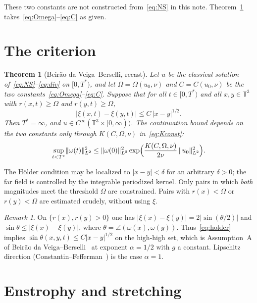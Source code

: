 \documentclass[11pt,a4paper]{article}
\newtheorem{theorem}{Theorem}
\theoremstyle{definition}
\theoremstyle{remark}
\newtheorem{remark}{Remark}
\newcommand{\T}{\mathbb{T}}
\newcommand{\abs}[1]{\lvert#1\rvert}
\newcommand{\norm}[1]{\lVert#1\rVert}
\begin{document}
These two constants are not constructed from~\eqref{eq:NS} in this note.
Theorem~\ref{thm:A} takes~\eqref{eq:Omega}--\eqref{eq:C} as given.

\section{The criterion}

\begin{theorem}[Beir\~ao da Veiga--Berselli, recast]
\label{thm:A}
Let \(u\) be the classical solution of~\eqref{eq:NS}--\eqref{eq:div} on
\([0,T^*)\), and let \(\Omega=\Omega(u_0,\nu)\) and \(C=C(u_0,\nu)\) be
the two constants~\eqref{eq:Omega}--\eqref{eq:C}. Suppose that for all
\(t\in[0,T^*)\) and all \(x,y\in\T^3\) with \(r(x,t)\ge\Omega\) and
\(r(y,t)\ge\Omega\),
\begin{equation}
\label{eq:holder}
\abs{\xi(x,t)-\xi(y,t)}\le C\,\abs{x-y}^{1/2}.
\end{equation}
Then \(T^*=\infty\), and \(u\in C^\infty(\T^3\times[0,\infty))\).
The continuation bound depends on the two constants only through \(K(C,\Omega,\nu)\)
in~\eqref{eq:Kconst}:
\begin{equation}
\label{eq:bound-thm}
\sup_{t<T^*}\norm{\omega(t)}_{L^2}^2
\le \norm{\omega(0)}_{L^2}^2
\exp\Bigl(\frac{K(C,\Omega,\nu)}{2\nu}\,\norm{u_0}_{L^2}^2\Bigr).
\end{equation}
\end{theorem}

The H\"older condition may be localized to \(\abs{x-y}<\delta\) for an
arbitrary \(\delta>0\); the far field is controlled by the integrable
periodized kernel. Only pairs in which \emph{both} magnitudes meet the
threshold \(\Omega\) are constrained. Pairs with \(r(x)<\Omega\) or
\(r(y)<\Omega\) are estimated crudely, without using \(\xi\).

\begin{remark}
On \(\{r(x),r(y)>0\}\) one has
\(\abs{\xi(x)-\xi(y)}=2\abs{\sin(\theta/2)}\) and
\(\sin\theta\le\abs{\xi(x)-\xi(y)}\), where \(\theta=\angle(\omega(x),\omega(y))\).
Thus~\eqref{eq:holder} implies
\(\sin\theta(x,y,t)\le C\abs{x-y}^{1/2}\) on the high-high set, which is
Assumption~A of Beir\~ao da Veiga--Berselli~\cite{BdVB2002} at exponent
\(\alpha=1/2\) with \(g\) a constant. Lipschitz direction
(Constantin--Fefferman~\cite{CF1993}) is the case \(\alpha=1\).
\end{remark}

\section{Enstrophy and stretching}
\end{document}
